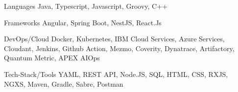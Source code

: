 

\begin{cvskills}

  \cvskill
    {Languages} %
    {Java, Typescript, Javascript, Groovy, C++} %

  \cvskill
    {Frameworks} %
    {Angular, Spring Boot, NestJS, React.Js} %

  \cvskill
    {DevOps/Cloud} %
    {Docker, Kubernetes, IBM Cloud Services, Azure Services, Cloudant, Jenkins, Github Action, Mezmo, Coverity, Dynatrace, Artifactory, Quantum Metric, APEX AIOps} %

  \cvskill
    {Tech-Stack/Tools} %
    {YAML, REST API, Node.JS, SQL, HTML, CSS, RXJS, NGXS, Maven, Gradle, Sabre, Postman} %

\end{cvskills}
